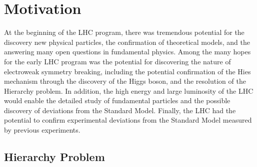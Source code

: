 
%
\section{Motivation}





At the beginning of the LHC program, there was tremendous potential for the discovery new physical particles, the confirmation of theoretical models,
and the answering many open questions in fundamental physics.
Among the many hopes for the early LHC program was the potential for discovering the nature of electroweak symmetry breaking,
including the potential confirmation of the Hies mechanism through the discovery of the Higgs boson, and the resolution of the Hierarchy problem.
In addition, the high energy and large luminosity of the LHC would enable the detailed study of fundamental particles and the possible discovery of deviations from the Standard Model.
Finally, the LHC had the potential to confirm experimental deviations from the Standard Model measured by previous experiments.


\subsection{Hierarchy Problem}

